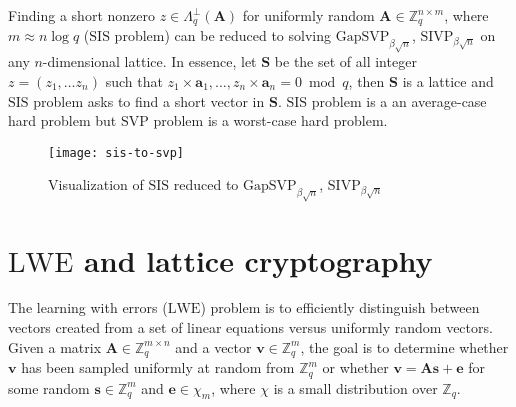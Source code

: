 Finding a short nonzero $z \in \Lambda_q^{\perp}(\textbf{A})$ for uniformly random $\textbf{A} \in \mathbb{Z}_q^{n \times m}$, where $m \approx n \log q$ ($\mathrm{SIS}$ problem) can be reduced to solving $\mathrm{GapSVP}_{\beta\sqrt{n}}$, $\mathrm{SIVP}_{\beta\sqrt{n}}$ on any $n$-dimensional lattice. In essence, let $\textbf{S}$ be the set of all integer $z = (z_1, \dots z_n)$ such that $z_1\times{\textbf{a}_{1}}, \dots, z_n\times{\textbf{a}_{n}} = 0 \bmod q$, then $\textbf{S}$ is a lattice and $\mathrm{SIS}$ problem asks to find a short vector in $\textbf{S}$. $\mathrm{SIS}$ problem is a an average-case hard problem but $\mathrm{SVP}$ problem is a worst-case hard problem.


\begin{figure}[H]
\centering
\texttt{[image: sis-to-svp]}
\caption{Visualization of $\mathrm{SIS}$ reduced to $\mathrm{GapSVP}_{\beta\sqrt{n}}$, $\mathrm{SIVP}_{\beta\sqrt{n}}$}
\end{figure}





\section{\texorpdfstring{$\mathrm{LWE}$}{LWE} and lattice cryptography}
The learning with errors ($\mathrm{LWE}$) problem is to efficiently distinguish between vectors created from a  set of linear equations versus uniformly random vectors. Given a matrix $\textbf{A} \in \mathbb{Z}^{m \times n}_q$ and a vector $\textbf{v} \in \mathbb{Z}^m_q$, the goal is to determine whether $\textbf{v}$ has been sampled uniformly at random from $\mathbb{Z}^m_q$ or whether $\textbf{v} = \textbf{A}\textbf{s} + \textbf{e}$ for some random $\textbf{s} \in \mathbb{Z}^m_q$ and $\textbf{e} \in \chi_m$, where $\chi$ is a small  distribution over $\mathbb{Z}_q$.

